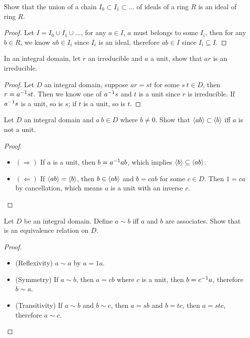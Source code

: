 \documentclass[../main.tex]{subfiles}
\begin{document}
\begin{exercise}
  Show that the union of a chain $I_0 \subset I_1 \subset \dots$ of ideals of a
  ring $R$ is an ideal of ring $R$.
\end{exercise}
\begin{proof}
  Let $I = I_0 \cup I_1 \cup \dots$, for any $a \in I$, $a$ must belongs to
  some $I_i$, then for any $b \in R$, we know $ab \in I_i$ since $I_i$ is an ideal,
  therefore $ab \in I$ since $I_i \subseteq I$.
\end{proof}

\begin{exercise}
  In an integral domain, let $r$ an irreducible and $a$ a unit, show that $ar$ is
  an irreducible.
\end{exercise}
\begin{proof}
  Let $D$ an integral domain, suppose $ar = st$ for some $s \ t \in D$,
  then $r = a^{-1}st$. Then we know one of $a^{-1}s$ and $t$ is a unit
  since $r$ is irreducible.
  If $a^{-1}s$ is a unit, so is $s$; if $t$ is a unit, so is $t$.
\end{proof}

\begin{exercise}
  Let $D$ an integral domain and $a \ b \in D$ where $b \neq 0$.
  Show that $\langle ab \rangle \subset \langle b \rangle$ iff $a$ is not a unit.
\end{exercise}
\begin{proof}
  ~
  \begin{itemize}
    \item $(\Rightarrow)$ If $a$ is a unit, then $b = a^{-1}ab$, which implies $\langle b \rangle \subseteq \langle ab \rangle$.
    \item $(\Leftarrow)$ If $\langle ab \rangle = \langle b \rangle$, then $b \in \langle ab \rangle$ and $b = cab$ for some $c \in D$.
          Then $1 = ca$ by cancellation, which means $a$ is a unit with an inverse $c$.
  \end{itemize}
\end{proof}

\begin{exercise}
  Let $D$ be an integral domain. Define $a \sim b$ iff $a$ and $b$ are associates.
  Show that $~$ is an equivalence relation on $D$.
\end{exercise}
\begin{proof}
  ~
  \begin{itemize}
    \item (Reflexivity) $a \sim a$ by $a = 1a$.
    \item (Symmetry) If $a \sim b$, then $a = cb$ where $c$ is a unit, then $b = c^{-1}a$, therefore $b \sim a$.
    \item (Transitivity) If $a \sim b$ and $b \sim c$, then $a = sb$ and $b = tc$, then $a = stc$, therefore $a \sim c$.
  \end{itemize}
\end{proof}
\end{document}
